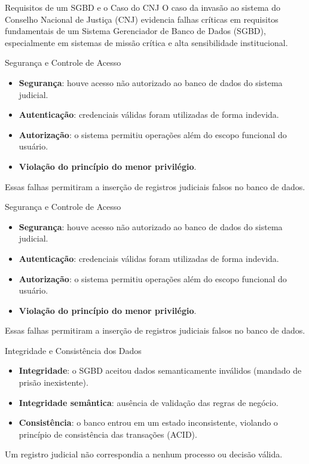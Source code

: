 \documentclass[9pt]{beamer}
\begin{document}
\begin{frame}{Requisitos de um SGBD e o Caso do CNJ}
O caso da invasão ao sistema do Conselho Nacional de Justiça (CNJ) evidencia falhas
críticas em requisitos fundamentais de um Sistema Gerenciador de Banco de Dados (SGBD),
especialmente em sistemas de missão crítica e alta sensibilidade institucional.
\end{frame}
\begin{frame}{Segurança e Controle de Acesso}
\begin{itemize}
  \item \textbf{Segurança}: houve acesso não autorizado ao banco de dados do sistema judicial.
  \item \textbf{Autenticação}: credenciais válidas foram utilizadas de forma indevida.
  \item \textbf{Autorização}: o sistema permitiu operações além do escopo funcional do usuário.
  \item \textbf{Violação do princípio do menor privilégio}.
\end{itemize}

Essas falhas permitiram a inserção de registros judiciais falsos no banco de dados.
\end{frame}
\begin{frame}{Segurança e Controle de Acesso}
\begin{itemize}
  \item \textbf{Segurança}: houve acesso não autorizado ao banco de dados do sistema judicial.
  \item \textbf{Autenticação}: credenciais válidas foram utilizadas de forma indevida.
  \item \textbf{Autorização}: o sistema permitiu operações além do escopo funcional do usuário.
  \item \textbf{Violação do princípio do menor privilégio}.
\end{itemize}

Essas falhas permitiram a inserção de registros judiciais falsos no banco de dados.
\end{frame}
\begin{frame}{Integridade e Consistência dos Dados}
\begin{itemize}
  \item \textbf{Integridade}: o SGBD aceitou dados semanticamente inválidos
  (mandado de prisão inexistente).
  \item \textbf{Integridade semântica}: ausência de validação das regras de negócio.
  \item \textbf{Consistência}: o banco entrou em um estado inconsistente,
  violando o princípio de consistência das transações (ACID).
\end{itemize}

Um registro judicial não correspondia a nenhum processo ou decisão válida.
\end{frame}
\end{document}
